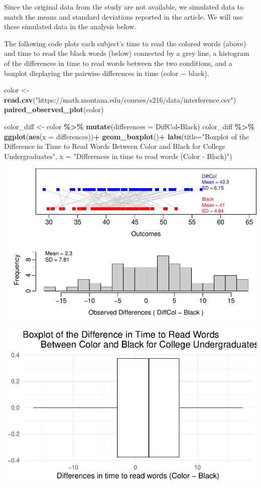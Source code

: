 \documentclass[
]{report}
\newenvironment{Shaded}{\begin{snugshade}}{\end{snugshade}}
\newcommand{\AttributeTok}[1]{\textcolor[rgb]{0.13,0.29,0.53}{#1}}
\newcommand{\FunctionTok}[1]{\textcolor[rgb]{0.13,0.29,0.53}{\textbf{#1}}}
\newcommand{\NormalTok}[1]{#1}
\newcommand{\OtherTok}[1]{\textcolor[rgb]{0.56,0.35,0.01}{#1}}
\newcommand{\SpecialCharTok}[1]{\textcolor[rgb]{0.81,0.36,0.00}{\textbf{#1}}}
\newcommand{\StringTok}[1]{\textcolor[rgb]{0.31,0.60,0.02}{#1}}
\begin{document}
Since the original data from the study are not available, we simulated data to match the means and standard deviations reported in the article. We will use these simulated data in the analysis below.

The following code plots each subject's time to read the colored words (above) and time to read the black words (below) connected by a grey line, a histogram of the differences in time to read words between the two conditions, and a boxplot displaying the pairwise differences in time (color \(-\) black).

\begin{Shaded}
\begin{Highlighting}[]
\NormalTok{color }\OtherTok{\textless{}{-}} \FunctionTok{read.csv}\NormalTok{(}\StringTok{"https://math.montana.edu/courses/s216/data/interference.csv"}\NormalTok{)}
\FunctionTok{paired\_observed\_plot}\NormalTok{(color)}

\NormalTok{color\_diff }\OtherTok{\textless{}{-}}\NormalTok{ color }\SpecialCharTok{\%\textgreater{}\%} 
  \FunctionTok{mutate}\NormalTok{(}\AttributeTok{differences =}\NormalTok{ DiffCol}\SpecialCharTok{{-}}\NormalTok{Black)}
\NormalTok{color\_diff }\SpecialCharTok{\%\textgreater{}\%}
  \FunctionTok{ggplot}\NormalTok{(}\FunctionTok{aes}\NormalTok{(}\AttributeTok{x =}\NormalTok{ differences))}\SpecialCharTok{+}
  \FunctionTok{geom\_boxplot}\NormalTok{()}\SpecialCharTok{+}
  \FunctionTok{labs}\NormalTok{(}\AttributeTok{title=}\StringTok{"Boxplot of the Difference in Time to Read Words }
\StringTok{       Between Color and Black for College Undergraduates"}\NormalTok{,}
       \AttributeTok{x =} \StringTok{"Differences in time to read words (Color {-} Black)"}\NormalTok{)}
\end{Highlighting}
\end{Shaded}

\begin{center}\includegraphics[width=0.7\linewidth]{11-OCA08-paired-theory_files/figure-latex/unnamed-chunk-1-1} \includegraphics[width=0.7\linewidth]{11-OCA08-paired-theory_files/figure-latex/unnamed-chunk-1-2} \end{center}
\end{document}

